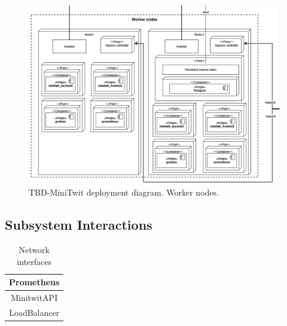 \begin {figure}[H]
    \centering
    \includegraphics[scale=0.45]{images/DevopsDiagrams-Deployment worker nodes.drawio(2).png}
    \caption{TBD-MiniTwit deployment diagram. Worker nodes.}
    \label{fig:figDeployWorker}
\end{figure}



\subsection{Subsystem Interactions}
\label{subsec:subsystem_interactions}
\begin{table}[h!]
    \centering
    \begin{tabular}{|c|} \hline
         Prometheus \\ \hline
         MinitwitAPI \\ \hline
         LoadBalancer \\ \hline
    \end{tabular}
    \caption{Network interfaces}
    \label{tab:my_label}
\end{table}

